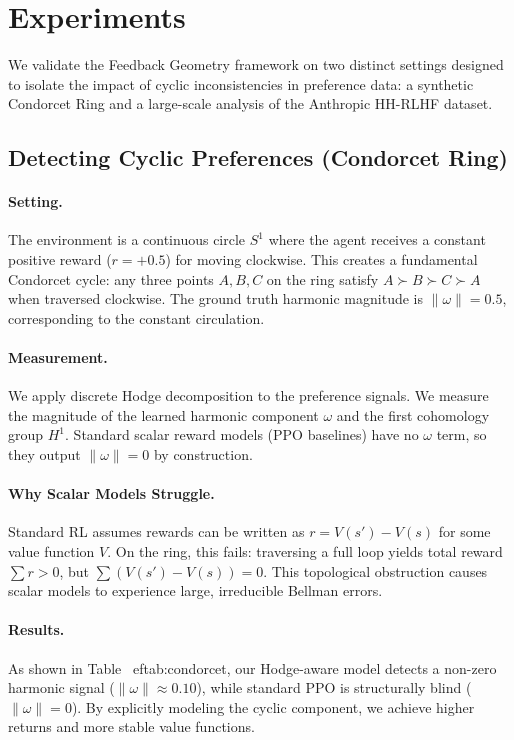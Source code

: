\section{Experiments}
\label{sec:experiments}

We validate the Feedback Geometry framework on two distinct settings designed to isolate the impact of cyclic inconsistencies in preference data: a synthetic Condorcet Ring and a large-scale analysis of the Anthropic HH-RLHF dataset.

\subsection{Detecting Cyclic Preferences (Condorcet Ring)}

\paragraph{Setting.} The environment is a continuous circle $S^1$ where the agent receives a constant positive reward ($r = +0.5$) for moving clockwise. This creates a fundamental Condorcet cycle: any three points $A, B, C$ on the ring satisfy $A \succ B \succ C \succ A$ when traversed clockwise. The ground truth harmonic magnitude is $\|\omega\| = 0.5$, corresponding to the constant circulation.

\paragraph{Measurement.} We apply discrete Hodge decomposition to the preference signals. We measure the magnitude of the learned harmonic component $\omega$ and the first cohomology group $H^1$. Standard scalar reward models (PPO baselines) have no $\omega$ term, so they output $\|\omega\| = 0$ by construction.

\paragraph{Why Scalar Models Struggle.}
Standard RL assumes rewards can be written as $r = V(s') - V(s)$ for some value function $V$. On the ring, this fails: traversing a full loop yields total reward $\sum r > 0$, but $\sum (V(s') - V(s)) = 0$. This topological obstruction causes scalar models to experience large, irreducible Bellman errors.

\paragraph{Results.}
As shown in Table~
ef{tab:condorcet}, our Hodge-aware model detects a non-zero harmonic signal ($\|\omega\| \approx 0.10$), while standard PPO is structurally blind ($\|\omega\| = 0$). By explicitly modeling the cyclic component, we achieve higher returns and more stable value functions.

